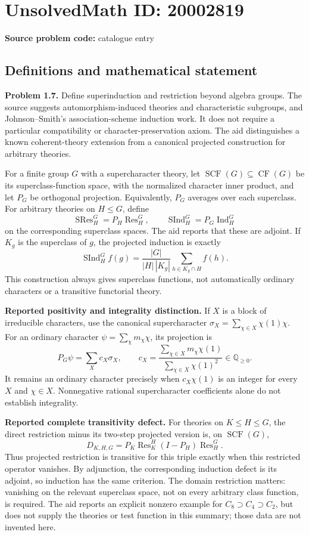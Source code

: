 \documentclass[11pt]{article}
\newcommand{\Q}{\mathbb{Q}}
\begin{document}
\section*{UnsolvedMath ID: 20002819}
\textbf{Source problem code:} catalogue entry
\subsection{Definitions and mathematical statement}
\textbf{Problem 1.7.} Define superinduction and restriction beyond algebra groups. The source suggests automorphism-induced theories and characteristic subgroups, and Johnson--Smith's association-scheme induction work. It does not require a particular compatibility or character-preservation axiom. The aid distinguishes a known coherent-theory extension from a canonical projected construction for arbitrary theories.

For a finite group \(G\) with a supercharacter theory, let \(\operatorname{SCF}(G)\subseteq\operatorname{CF}(G)\) be its superclass-function space, with the normalized character inner product, and let \(P_G\) be orthogonal projection. Equivalently, \(P_G\) averages over each superclass. For arbitrary theories on \(H\leq G\), define
\[
 \operatorname{SRes}_H^G=P_H\operatorname{Res}_H^G,
 \qquad
 \operatorname{SInd}_H^G=P_G\operatorname{Ind}_H^G
\]
on the corresponding superclass spaces. The aid reports that these are adjoint. If \(K_g\) is the superclass of \(g\), the projected induction is exactly
\[
 \operatorname{SInd}_H^G f(g)=
 \frac{|G|}{|H|\,|K_g|}\sum_{h\in K_g\cap H}f(h).
\]
This construction always gives superclass functions, not automatically ordinary characters or a transitive functorial theory.

\textbf{Reported positivity and integrality distinction.} If \(X\) is a block of irreducible characters, use the canonical supercharacter \(\sigma_X=\sum_{\chi\in X}\chi(1)\chi\). For an ordinary character \(\psi=\sum_\chi m_\chi\chi\), its projection is
\[
 P_G\psi=\sum_Xc_X\sigma_X,\qquad
 c_X=\frac{\sum_{\chi\in X}m_\chi\chi(1)}
            {\sum_{\chi\in X}\chi(1)^2}\in\Q_{\geq0}.
\]
It remains an ordinary character precisely when \(c_X\chi(1)\) is an integer for every \(X\) and \(\chi\in X\). Nonnegative rational supercharacter coefficients alone do not establish integrality.

\textbf{Reported complete transitivity defect.} For theories on \(K\leq H\leq G\), the direct restriction minus its two-step projected version is, on \(\operatorname{SCF}(G)\),
\[
 D_{K,H,G}=P_K\operatorname{Res}_K^H(I-P_H)
                \operatorname{Res}_H^G.
\]
Thus projected restriction is transitive for this triple exactly when this restricted operator vanishes. By adjunction, the corresponding induction defect is its adjoint, so induction has the same criterion. The domain restriction matters: vanishing on the relevant superclass space, not on every arbitrary class function, is required. The aid reports an explicit nonzero example for \(C_8\supset C_4\supset C_2\), but does not supply the theories or test function in this summary; those data are not invented here.
\end{document}
